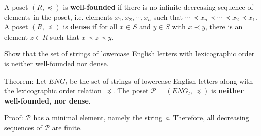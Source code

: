 \documentclass[addpoints]{exam}
\begin{document}
\begin{questions}
\begin{solution}
  \end{solution}
  
\question 
A poset $(R, \preccurlyeq)$ is \textbf{well-founded} if there is no infinite decreasing sequence of elements in the poset, i.e. elements $x_1, x_2, \cdots, x_n$ such that $\cdots \prec x_n \prec \cdots  \prec x_2 \prec x_1$. A poset $(R, \preccurlyeq)$ is \textbf{dense} if for all $x \in S$ and $y \in S$ with $x \prec y$, there is an element $z \in R$ such that $x \prec z \prec y$.

Show that the set of strings of lowercase English letters with lexicographic order is neither well-founded nor dense.


  \begin{solution}
    
    Theorem: Let $ENG_l$ be the set of strings of lowercase English letters along with the lexicographic order relation $\preccurlyeq$. The poset $\mathcal{P} = (ENG_l,\preccurlyeq)$ is \textbf{neither well-founded, nor dense}.
    
    Proof: $\mathcal{P}$ has a minimal element, namely the string \textit{a}. Therefore, all decreasing sequences of $\mathcal{P}$ are finite. 
    

\end{solution}
\end{questions}
\end{document}

